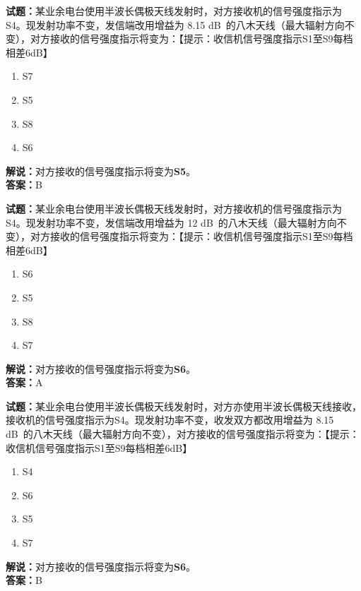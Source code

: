 \documentclass{ctexbook}
\begin{document}

\bigskip


\noindent\textbf{试题：}某业余电台使用半波长偶极天线发射时，对方接收机的信号强度指示为S4。现发射功率不变，发信端改用增益为 8.15 \unit[qualifier-mode=combine]{\deci\bel{}}的八木天线（最大辐射方向不变），对方接收的信号强度指示将变为：【提示：收信机信号强度指示S1至S9每档相差6dB】
\begin{enumerate}[leftmargin=3em]
\item S7
\item S5
\item S8
\item S6
\end{enumerate}
\noindent\textbf{解说：}对方接收的信号强度指示将变为\textbf{S5}。\\\noindent\textbf{答案：}B



\bigskip


\noindent\textbf{试题：}某业余电台使用半波长偶极天线发射时，对方接收机的信号强度指示为S4。现发射功率不变，发信端改用增益为 12 \unit[qualifier-mode=combine]{\deci\bel{}}的八木天线（最大辐射方向不变），对方接收的信号强度指示将变为：【提示：收信机信号强度指示S1至S9每档相差6dB】
\begin{enumerate}[leftmargin=3em]
\item S6
\item S5
\item S8
\item S7
\end{enumerate}
\noindent\textbf{解说：}对方接收的信号强度指示将变为\textbf{S6}。\\\noindent\textbf{答案：}A



\bigskip


\noindent\textbf{试题：}某业余电台使用半波长偶极天线发射时，对方亦使用半波长偶极天线接收，接收机的信号强度指示为S4。现发射功率不变，收发双方都改用增益为 8.15 \unit[qualifier-mode=combine]{\deci\bel{}}的八木天线（最大辐射方向不变），对方接收的信号强度指示将变为：【提示：收信机信号强度指示S1至S9每档相差6dB】
\begin{enumerate}[leftmargin=3em]
\item S4
\item S6
\item S5
\item S7
\end{enumerate}
\noindent\textbf{解说：}对方接收的信号强度指示将变为\textbf{S6}。\\\noindent\textbf{答案：}B
\end{document}
